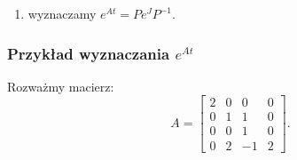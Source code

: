 \documentclass{article}
\begin{document}
\begin{enumerate}
\begin{itemize}
\begin{itemize}
                \item ostatecznie otrzymujemy $e^{J_{n_k}(\lambda_{k})t} = 
                \begin{bmatrix}
                    e^{\lambda_{k}t} & \frac{te^{\lambda_{k}t}}{1!} & \frac{t^2e^{\lambda_{k}t}}{2!} & \cdots & \frac{t^{n-1}e^{\lambda_{k}t}}{(n-1)!}\\
                    0                 & e^{\lambda_{k}t} & \frac{te^{\lambda_{k}t}}{1!} & \cdots & \frac{t^{n-2}e^{\lambda_{k}t}}{(n-2)!}\\
                    \vdots & \vdots & \vdots & \ddots & \vdots\\
                    0 & 0 & 0 & \cdots & e^{\lambda_{k}}
                \end{bmatrix}
                $
            \end{itemize}
        \item eksponenta macierzy Jordana ma więc postać:
        $
            e^{J}
            =
            \begin{bmatrix}
                e^{J_{1}(\lambda_{1})} & \mathbf{0} & \cdots & \mathbf{0}\\
                \mathbf{0} & e^{J_{2}(\lambda_{2})} & \cdots & \mathbf{0}\\
                \vdots & \vdots & \ddots & \vdots\\
                \mathbf{0} & \mathbf{0} & \cdots & e^{J_{k}(\lambda_{k})}
            \end{bmatrix}
        $
    \end{itemize}
    \item wyznaczamy $e^{At} = P e^{J} P^{-1}$.
\end{enumerate}

\subsubsection{Przykład wyznaczania $e^{At}$}
Rozważmy macierz:
$$
    A 
    =
    \begin{bmatrix}
        2 & 0 &  0 & 0\\
        0 & 1 &  1 & 0\\
        0 & 0 &  1 & 0\\
        0 & 2 & -1 & 2
    \end{bmatrix}.
$$
\end{document}
